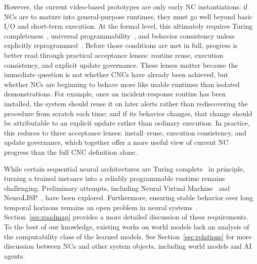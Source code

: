 However, the current video-based prototypes are only early NC instantiations: if NCs are to mature into general-purpose runtimes, they must go well beyond basic I/O and short-term execution.
At the formal level, this ultimately requires Turing completeness~\citep{Goedel:31,Church:35,turing1936computable,siegelmann1992computational}, universal programmability~\citep{von1993first,wilkes1981best}, and behavior consistency unless explicitly reprogrammed~\citep{queloz2025explainability}.
Before those conditions are met in full, progress is better read through practical acceptance lenses: routine reuse, execution consistency, and explicit update governance.
These lenses matter because the immediate question is not whether CNCs have already been achieved, but whether NCs are beginning to behave more like usable runtimes than isolated demonstrations.
For example, once an incident-response routine has been installed, the system should reuse it on later alerts rather than rediscovering the procedure from scratch each time; and if its behavior changes, that change should be attributable to an explicit update rather than ordinary execution.
In practice, this reduces to three acceptance lenses: install--reuse, execution consistency, and update governance, which together offer a more useful view of current NC progress than the full CNC definition alone.

While certain sequential neural architectures are Turing complete~\citep{siegelmann1992computational,perez2021attention} in principle, turning a trained instance into a reliably programmable runtime remains challenging.
Preliminary attempts, including Neural Virtual Machine~\citep{katz2019programmable} and NeuroLISP~\citep{davis2022neurolisp}, have been explored.
Furthermore, ensuring stable behavior over long temporal horizons remains an open problem in neural systems~\citep{kirkpatrick2017overcoming,calanzonelogically}. 
Section~\ref{sec:roadmap} provides a more detailed discussion of these requirements. 
To the best of our knowledge, existing works on world models lack an analysis of the computability class of the learned models.
See Section~\ref{sec:relations} for more discussion between NCs and other system objects, including world models and AI agents.

